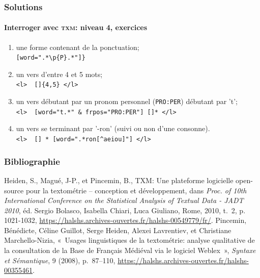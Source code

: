 \documentclass{beamer}
\begin{document}
\begin{frame}[fragile]
\frametitle{Solutions}
\framesubtitle{Interroger avec \textsc{txm}: niveau 4, exercices}

\begin{enumerate}
	\item une forme contenant de la ponctuation;\\
	\verb|[word=".*\p{P}.*"]}|
	\item un vers d'entre 4 et 5 mots;\\
	\verb|<l>  []{4,5} </l>|
	\item un vers débutant par un pronom personnel (\texttt{PRO:PER}) débutant par 't';\\
	\verb|<l>  [word="t.*" & frpos="PRO:PER"] []* </l>|
	\item un vers se terminant par '-ron' (suivi ou non d'une consonne).\\
	\verb|<l>  [] * [word=".*ron[^aeiou]"] </l>|
\end{enumerate}

\end{frame}


\begin{frame}[fragile]
\frametitle{Bibliographie} 

\begin{thebibliography}{Heiden et al., 2010}
	 Heiden, S., Magué, J-P., et Pincemin, B., \og{}TXM: Une plateforme logicielle open-source pour la textométrie – conception et développement\fg{}, dans \textit{Proc. of 10th International Conference on the Statistical Analysis of Textual Data - JADT 2010}, éd. Sergio Bolasco, Isabella Chiari, Luca Giuliano, Rome, 2010, t.~2, p. 1021-1032, \url{https://halshs.archives-ouvertes.fr/halshs-00549779/fr/}.
	 Pincemin, Bénédicte, Céline Guillot, Serge Heiden, Alexei Lavrentiev, et Christiane Marchello-Nizia, « Usages linguistiques de la textométrie: analyse qualitative de la consultation de la Base de Français Médiéval via le logiciel Weblex », \textit{Syntaxe et Sémantique}, 9 (2008), p.~87–110, \url{https://halshs.archives-ouvertes.fr/halshs-00355461}.
	
	
	
\end{thebibliography}


\end{frame}
\end{document}
